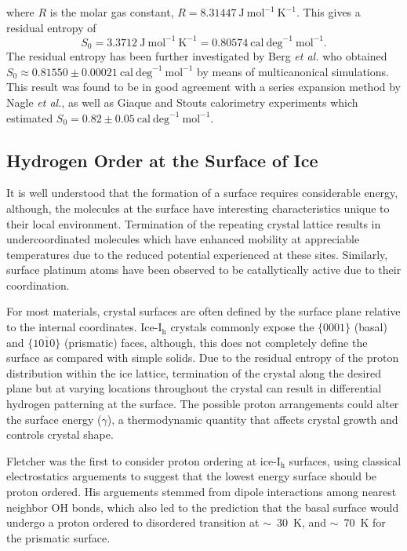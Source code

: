 where $R$ is the molar gas constant,
$R = 8.31447~\mathrm{J~mol}^{-1}~\mathrm{K}^{-1}$. This gives a
residual entropy of
\begin{equation}
  S_{0} = 3.3712~\mathrm{J~mol}^{-1}~\mathrm{K}^{-1} = 0.80574~\mathrm{cal~deg}^{-1}~ \mathrm{mol}^{-1}.
\end{equation}
The residual entropy has been further investigated by Berg \textit{et
  al.} who obtained
$S_{0} \approx 0.81550 \pm 0.00021~\mathrm{cal~deg}^{-1}
~\mathrm{mol}^{-1}$ by means of multicanonical
simulations.\cite{Berg2007} This result was found to be in good
agreement with a series expansion method by Nagle \textit{et
  al.}\cite{Nagle1966}, as well as Giaque and Stouts calorimetry
experiments which estimated
$S_{0} = 0.82 \pm 0.05~\mathrm{cal~deg}^{-1}
~\mathrm{mol}^{-1}$.\cite{Giaque1936}



\subsection{Hydrogen Order at the Surface of Ice}
It is well understood that the formation of a surface requires
considerable energy, although, the molecules at the surface have
interesting characteristics unique to their local
environment. Termination of the repeating crystal lattice results in
undercoordinated molecules which have enhanced mobility at appreciable
temperatures due to the reduced potential experienced at these
sites.\cite{} Similarly, surface platinum atoms have been observed to
be catallytically active due to their coordination.\cite{}

For most materials, crystal surfaces are often defined by the surface
plane relative to the internal coordinates. Ice-I$_\mathrm{h}$
crystals commonly expose the $\{0001\}$ (basal) and $\{10\bar{1}0\}$
(prismatic) faces, although, this does not completely define the
surface as compared with simple solids. Due to the residual entropy of
the proton distribution within the ice lattice, termination of the
crystal along the desired plane but at varying locations throughout
the crystal can result in differential hydrogen patterning at the
surface. The possible proton arrangements could alter the surface
energy ($\gamma$), a thermodynamic quantity that affects crystal growth and
controls crystal shape.

Fletcher was the first to consider proton ordering at
ice-I$_\mathrm{h}$ surfaces, using classical electrostatics arguements
to suggest that the lowest energy surface should be proton
ordered.\cite{Fletcher1992} His arguements stemmed from dipole
interactions among nearest neighbor OH bonds, which also led to the
prediction that the basal surface would undergo a proton ordered to
disordered transition at $\sim$~30~K, and $\sim$~70~K for the
prismatic surface. 

